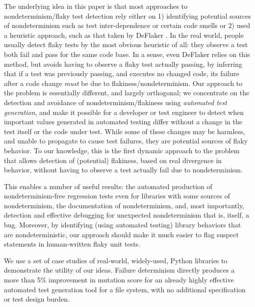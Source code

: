 The underlying idea in this paper is that most approaches to
nondeterminism/flaky test detection rely either on 1) identifying
potential sources of nondeterminism such as test inter-dependence
\cite{LamZE2015} or certain code smells \cite{palomba2017does}  or 2)
used a heuristic approach, such as that taken by DeFlaker
\cite{bell2018d}.  In the real world, people usually detect flaky
tests by the most obvious heuristic of all:  they observe a test both
fail and pass for the same code base.  In a sense, even DeFlaker
relies on this method, but avoids having to observe a flaky test actually
passing, by inferring that if a test was previously passing, and
executes no changed code, its failure after a code change \emph{must}
be due to flakiness/nondeterminism.  Our approach to the problem is
essentially different, and largely orthogonal; we concentrate on the detection and avoidance of
nondeterminism/flakiness using \emph{automated test generation},
and make it possible for a developer or test engineer to detect when
important values generated in automated testing differ without a
change in the test itself or the code under test.  While some of these
changes may be harmless, and unable to propagate to cause test
failures, they are potential sources of flaky behavior.  To our
knowledge, this is the first dynamic approach to the problem that
allows detection of (potential) flakiness, based on real divergence in
behavior, without having to observe a test actually fail due to nondeterminism.

This enables a number of useful results:
 the automated production of
nondeterminism-free regression tests even for libraries with some
sources of nondeterminism, the documentation of
nondeterminism, and, most importantly, detection and effective debugging for
unexpected nondeterminism that is, itself, a bug.  Moreover, by
identifying (using automated testing) library behaviors that are
nondeterministic, our approach should make it much easier to flag suspect
statements in human-written flaky unit tests.

We use a set
of case studies of real-world, widely-used, Python libraries to demonstrate the
utility of our ideas.  Failure determinism directly
produces a more than 5\% improvement in mutation score for an already highly
effective automated test generation tool for a file system, with no
additional specification or test design burden.